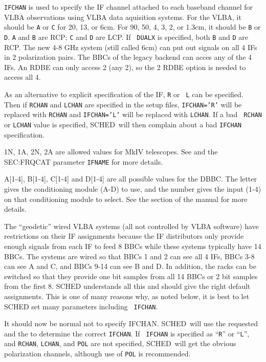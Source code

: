\documentclass{report}
\newcommand{\schedb}{{\sc SCHED~}}
\begin{document}
{\tt IFCHAN} is used to specify the IF channel attached to each
baseband channel for VLBA observations using VLBA data aquisition
systems.  For the VLBA, it should be {\tt A} or {\tt C} for 20, 13, or
6cm.  For 90, 50, 4, 3, 2, or 1.3cm, it should be {\tt B} or {\tt D}.
{\tt A} and {\tt B} are RCP; {\tt C} and {\tt D} are LCP. If {\tt
DUALX} is specified, both {\tt B} and {\tt D} are RCP. The new 4-8 GHz
system (still called 6cm) can put out signals on all 4 IFs in 2
polarization pairs.  The BBCs of the legacy backend can acces any
of the 4 IFs.  An RDBE can only access 2 (any 2), so the 2 RDBE
option is needed to access all 4.  

As an alternative to explicit specification of the IF, {\tt R} or {\tt
L} can be specified. Then if {\tt RCHAN} and {\tt LCHAN} are specified
in the setup files, {\tt IFCHAN='R'} will be replaced with {\tt RCHAN}
and {\tt IFCHAN='L'} will be replaced with {\tt LCHAN}.  If a bad {\tt
RCHAN} or {\tt LCHAN} value is specified, \schedb will then complain
about a bad {\tt IFCHAN} specification.

1N, 1A, 2N, 2A are allowed values for MkIV telescopes.
See  and the 
{SEC:FRQCAT} parameter {\tt IFNAME} for more details.

A[1-4], B[1-4], C[1-4] and D[1-4] are all possible values for
the DBBC. The letter gives the conditioning module (A-D) to use, and the
number gives the input (1-4) on that conditioning module to select. See
the  section of the manual for more
details.

The ``geodetic'' wired VLBA systems (all not controlled by VLBA
software) have restrictions on their IF assignments because the IF
distributors only provide enough signals from each IF to feed 8 BBCs
while these systems typically have 14 BBCs.  The systems are wired so
that BBCs 1 and 2 can see all 4 IFs, BBCs 3-8 can see A and C, and
BBCs 9-14 can see B and D.  In addition, the racks can be switched so
that they provide one bit samples from all 14 BBCs or 2 bit samples
from the first 8.  SCHED understands all this and should give the
right default assignments.  This is one of many reasons why, as noted
below, it is best to let SCHED set many parameters including {\tt
IFCHAN}.

It should now be normal not to specify IFCHAN.  \schedb will use the
requested  and the  to determine the correct {\tt IFCHAN}.  If {\tt
IFCHAN} is specified as ``{\tt R}'' or ``{\tt L}'', and {\tt RCHAN},
{\tt LCHAN}, and {\tt POL} are not specified, \schedb will get the
obvious polarization channels, although use of {\tt POL} is
recommended.
\end{document}
